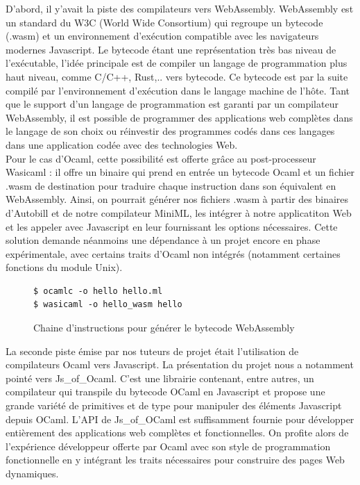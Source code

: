 \documentclass[12pt]{article}
\begin{document}
D'abord, il y'avait la piste des compilateurs vers WebAssembly. WebAssembly est un standard du W3C (World Wide Consortium) qui regroupe un bytecode (.wasm) et un environnement d'exécution compatible avec les navigateurs modernes Javascript. Le bytecode étant une représentation très bas niveau de l'exécutable, l'idée principale est de compiler un langage de programmation plus haut niveau, comme C/C++, Rust,.. vers bytecode. Ce bytecode est par la suite compilé par l'environnement d'exécution dans le langage machine de l'hôte. Tant que le support d'un langage de programmation est garanti par un compilateur WebAssembly, il est possible de programmer des applications web complètes dans le langage de son choix ou réinvestir des programmes codés dans ces langages dans une application codée avec des technologies Web. \\ 
Pour le cas d'Ocaml, cette possibilité est offerte grâce au post-processeur Wasicaml : il offre un binaire qui prend en entrée un bytecode Ocaml et un fichier .wasm de destination pour traduire chaque instruction dans son équivalent en WebAssembly. Ainsi, on pourrait générer nos fichiers .wasm à partir des binaires d'Autobill et de notre compilateur MiniML, les intégrer à notre applicatiton Web et les appeler avec Javascript en leur fournissant les options nécessaires. Cette solution demande néanmoins une dépendance à un projet encore en phase expérimentale, avec certains traits d'Ocaml non intégrés (notamment certaines fonctions du module Unix).\\ 
\begin{figure}
\begin{lstlisting}
$ ocamlc -o hello hello.ml
$ wasicaml -o hello_wasm hello
\end{lstlisting}
\caption{Chaine d'instructions pour générer le bytecode WebAssembly}
\end{figure}

La seconde piste émise par nos tuteurs de projet était l'utilisation de compilateurs Ocaml vers Javascript. La présentation du projet nous a notamment pointé vers Js\_of\_Ocaml. C'est une librairie contenant, entre autres, un compilateur qui transpile du bytecode OCaml en Javascript et propose une grande variété de primitives et de type pour manipuler des éléments Javascript depuis OCaml. L'API de Js\_of\_OCaml est suffisamment fournie pour développer entièrement des applications web complètes et fonctionnelles. On profite alors de l'expérience développeur offerte par Ocaml avec son style de programmation fonctionnelle en y intégrant les traits nécessaires pour construire des pages Web dynamiques.\\ 
\end{document}
